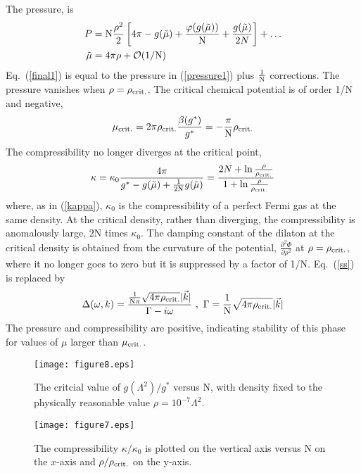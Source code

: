 \documentclass[twocolumn,secnumarabic,amssymb, nobibnotes, aps, prd]{revtex4}
\begin{document}
  The pressure, is 
 \begin{align}P&=  {\rm N}\frac{\rho^2}{2} \left[  
   4\pi - {g( \tilde\mu ) } +\frac{ \varphi(g( \tilde\mu ) ) }{\rm N}+ \frac{ g( \tilde\mu )}{2N } \right] 
 +\ldots
\label{final1}\\
 \tilde\mu &=4\pi\rho+{\mathcal O}(1/{\rm N})
 \end{align}
  Eq.\ (\ref{final1}) is equal to the pressure in (\ref{pressure1}) plus $\frac{1}{\rm N}$ corrections.
 The pressure vanishes when $\rho=\rho_{\rm crit.}$.
 The critical chemical potential is of order 1/N and negative, 
 \begin{align}
 \mu_{\rm crit.}= 2\pi\rho_{\rm crit.}\frac{\beta(g^*)}{g^*}=-\frac{\pi }{\rm N}\rho_{\rm crit.}
 \end{align}  
  The compressibility   
  no longer diverges at the critical point,  
\begin{align}
\kappa = \kappa_0    \frac{4\pi}{g^*-g(\tilde\mu )+\frac{1}{2\rm N}g(\tilde\mu ) }
=\frac{  2N+\ln\frac{\rho}{\rho_{\rm crit.}}}{1+\ln\frac{\rho}{\rho_{\rm crit.}}}
\end{align}
where, as in (\ref{kappa}), $\kappa_0$ is the  compressibility of a perfect Fermi gas at the same density.  At the critical density, rather than diverging, the compressibility is anomalously large, $2$N times $\kappa_0$.
The damping constant of the dilaton at the critical density is obtained from the curvature of the potential, 
$ \frac{\partial^2\Phi}{\partial\rho^2}$ at $\rho=\rho_{\rm crit.}$, where it no longer goes to zero but it is suppressed by a factor of 1/N.  Eq.\  (\ref{ss}) is replaced by
\begin{align}\label{ss1}
\Delta(\omega,k)=\frac{\frac{1}{{\rm N}\pi}  \sqrt{4\pi \rho_{\rm crit.} }|\vec k|}{\Gamma-i\omega}
~,~
\Gamma=  \frac{1 }{{\rm N}}    \sqrt{4\pi \rho_{\rm crit.}   }|\vec k| 
\end{align}
The pressure and compressibility are positive, indicating stability of this phase
for values of $\mu$  larger than $\mu_{\rm crit.}$.  

 \begin{figure}
\texttt{[image: figure8.eps]}\\
\begin{caption} {   The  critcial value of $g(\Lambda^2)/g^*$ versus N,  with density  fixed to the 
physically reasonable value  $\rho =10^{-7}\Lambda^2$.\label{phase2}  
}\end{caption}
 \end{figure}  
  \begin{figure}
\texttt{[image: figure7.eps]}\\
\begin{caption} {   The compressibility $\kappa/\kappa_0$ is plotted on the vertical
axis versus  N on the $x$-axis and $\rho/\rho_{\rm crit.}$  on the y-axis.   \label{phase3}  
}\end{caption}
 \end{figure}  
  
\end{document}

